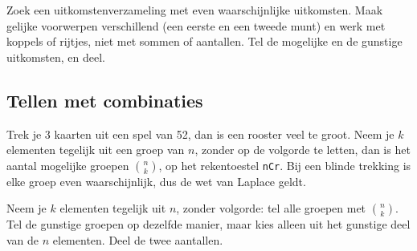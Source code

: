 \begin{werkwijze}
Zoek een uitkomstenverzameling met even waarschijnlijke uitkomsten. Maak gelijke voorwerpen verschillend (een eerste en een tweede munt) en werk met koppels of rijtjes, niet met sommen of aantallen. Tel de mogelijke en de gunstige uitkomsten, en deel.
\end{werkwijze}


\begin{oefeningen}


\end{oefeningen}

\subsection{Tellen met combinaties}

Trek je 3 kaarten uit een spel van 52, dan is een rooster veel te groot. Neem je $k$ elementen tegelijk uit een groep van $n$, zonder op de volgorde te letten, dan is het aantal mogelijke groepen $\binom{n}{k}$, op het rekentoestel \texttt{nCr}. Bij een blinde trekking is elke groep even waarschijnlijk, dus de wet van Laplace geldt.


\begin{werkwijze}
Neem je $k$ elementen tegelijk uit $n$, zonder volgorde: tel alle groepen met $\binom{n}{k}$. Tel de gunstige groepen op dezelfde manier, maar kies alleen uit het gunstige deel van de $n$ elementen. Deel de twee aantallen.
\end{werkwijze}

